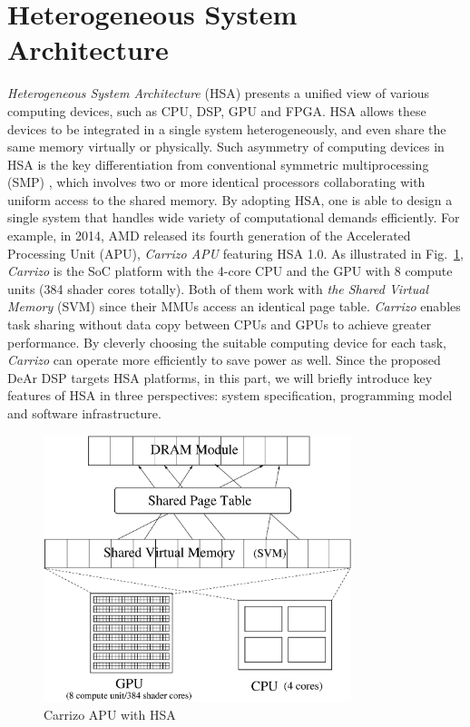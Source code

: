     \section{Heterogeneous System Architecture}
    \textit{Heterogeneous System Architecture} (HSA) presents a unified view of various computing devices, 
    such as CPU, DSP, GPU and FPGA.
    HSA allows these devices to be integrated in a single system heterogeneously, and even share the same memory virtually or physically.
    Such asymmetry of computing devices in HSA is the key differentiation from conventional symmetric multiprocessing (SMP) \cite{parallel},
    which involves two or more identical processors collaborating with uniform access to the shared memory.
    By adopting HSA, one is able to design a single system that handles wide variety of computational demands efficiently.
    For example, in 2014, AMD released its fourth generation of the Accelerated Processing Unit (APU), \textit{Carrizo APU} \cite{carrizo} featuring HSA 1.0.
    As illustrated in Fig.~\ref{fig:carrizo}, \textit{Carrizo} is the SoC platform with the 4-core CPU and the GPU with 8 compute units (384 shader cores totally).
    Both of them work with \textit{the Shared Virtual Memory} (SVM) since their MMUs access an identical page table.
    \textit{Carrizo} enables task sharing without data copy between CPUs and GPUs to achieve greater performance.
    By cleverly choosing the suitable computing device for each task, 
    \textit{Carrizo} can operate more efficiently to save power as well.
    Since the proposed DeAr DSP targets HSA platforms, 
    in this part, we will briefly introduce key features of HSA in three perspectives: 
    system specification, programming model and software infrastructure.
        \vspace{\textfig}
        \begin{figure}[!ht] 
            \centering
            \includegraphics[width=0.8\textwidth]{./figs/carrizo.eps}
            \caption{Carrizo APU with HSA}
            \label{fig:carrizo}
        \end{figure}
